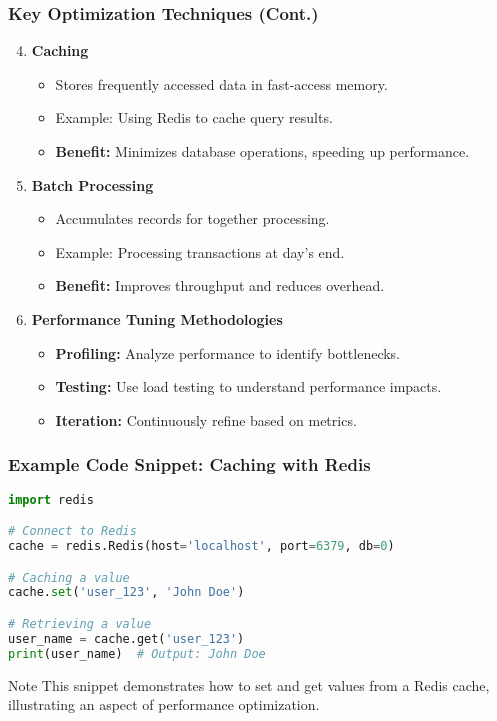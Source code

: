\documentclass{beamer}
\begin{document}
\begin{frame}[fragile]
    \frametitle{Key Optimization Techniques (Cont.)}
    \begin{enumerate}
        \setcounter{enumi}{3} %
        \item \textbf{Caching}
        \begin{itemize}
            \item Stores frequently accessed data in fast-access memory.
            \item Example: Using Redis to cache query results.
            \item \textbf{Benefit:} Minimizes database operations, speeding up performance.
        \end{itemize}

        \item \textbf{Batch Processing}
        \begin{itemize}
            \item Accumulates records for together processing.
            \item Example: Processing transactions at day's end.
            \item \textbf{Benefit:} Improves throughput and reduces overhead.
        \end{itemize}

        \item \textbf{Performance Tuning Methodologies}
        \begin{itemize}
            \item \textbf{Profiling:} Analyze performance to identify bottlenecks.
            \item \textbf{Testing:} Use load testing to understand performance impacts.
            \item \textbf{Iteration:} Continuously refine based on metrics.
        \end{itemize}
    \end{enumerate}
\end{frame}

\begin{frame}[fragile]
    \frametitle{Example Code Snippet: Caching with Redis}
    \begin{lstlisting}[language=Python]
import redis

# Connect to Redis
cache = redis.Redis(host='localhost', port=6379, db=0)

# Caching a value
cache.set('user_123', 'John Doe')

# Retrieving a value
user_name = cache.get('user_123')
print(user_name)  # Output: John Doe
    \end{lstlisting}
    \begin{block}{Note}
    This snippet demonstrates how to set and get values from a Redis cache, illustrating an aspect of performance optimization.
    \end{block}
\end{frame}
\end{document}
